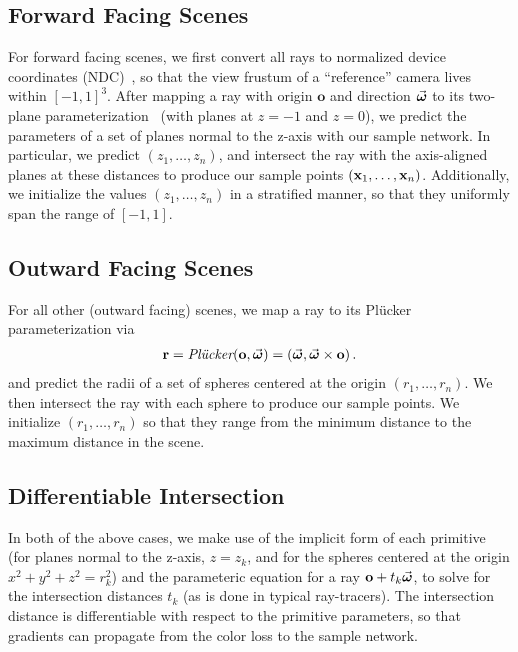 \documentclass[10pt,twocolumn,letterpaper]{article}
\begin{document}
\subsection{Forward Facing Scenes}

For forward facing scenes, we first convert all rays to normalized device coordinates (NDC)~\cite{MildeSTBRN2020}, so that the view frustum of a ``reference'' camera lives within $[-1, 1]^{3}$. After mapping a ray with origin $\mathbf{o}$ and direction $\vec{\boldsymbol{\omega}}$ to its two-plane parameterization~\cite{LevoyH1996} (with planes at $z = -1$ and $z=0$), we predict the parameters of a set of planes normal to the z-axis with our sample network. In particular, we predict $(z_1, \dots, z_n)$, and intersect the ray with the axis-aligned planes at these distances to produce our sample points $(\mathbf{x}_1, \dots, \mathbf{x}_n)$.
Additionally, we initialize the values $(z_1, \dots, z_n)$ in a stratified manner, so that they uniformly span the range of $[-1, 1]$. 

\subsection{Outward Facing Scenes}

For all other (outward facing) scenes, we map a ray to its Pl\"{u}cker parameterization via
\begin{align}
    \mathbf{r} = \textit{Pl\"{u}cker}(\mathbf{o}, \vec{\boldsymbol{\omega}}) = \left( \vec{\boldsymbol{\omega}}, \vec{\boldsymbol{\omega}} \times \mathbf{o} \right) \text{.}
\end{align}
\noindent and predict the radii of a set of spheres centered at the origin $(r_1, \dots, r_n)$. We then intersect the ray with each sphere to produce our sample points. We initialize $(r_1, \dots, r_n)$ so that they range from the minimum distance to the maximum distance in the scene. 

\subsection{Differentiable Intersection}

In both of the above cases, we make use of the implicit form of each primitive (for planes normal to the z-axis, $z = z_k$, and for the spheres centered at the origin $x^2 + y^2 + z^2 = r_k^2$) and the parameteric equation for a ray $\mathbf{o} + t_k\vec{\boldsymbol{\omega}}$, to solve for the intersection distances $t_k$ (as is done in typical ray-tracers). The intersection distance is differentiable with respect to the primitive parameters, so that gradients can propagate from the color loss to the sample network.
\end{document}
